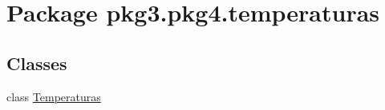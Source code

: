 \hypertarget{namespacepkg3_1_1pkg4_1_1temperaturas}{}\section{Package pkg3.\+pkg4.\+temperaturas}
\label{namespacepkg3_1_1pkg4_1_1temperaturas}
\subsection*{Classes}
\begin{DoxyCompactItemize}
\item 
class \mbox{\hyperlink{classpkg3_1_1pkg4_1_1temperaturas_1_1_temperaturas}{Temperaturas}}
\end{DoxyCompactItemize}
